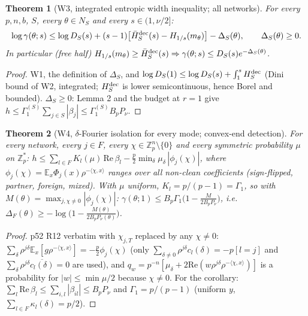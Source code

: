 \documentclass[11pt]{article}
\newtheorem{theorem}{Theorem}\newtheorem{lemma}[theorem]{Lemma}\newtheorem{corollary}[theorem]{Corollary}
\theoremstyle{remark}\newtheorem{remark}[theorem]{Remark}
\newcommand{\Hr}{H_{1/s}}
\begin{document}
\begin{theorem}[W3, integrated entropic width inequality; all networks]\label{W3}
For every $p,n,b$, $S$, every $\theta\in N_S$ and every $s\in(1,\nu/2]$:
\[\log\gamma(\theta;s)\le\log D_S(s)+(s-1)\big[\bar H^{\rm dec}_S(s)-\Hr(m_\theta)\big]-\Delta_S(\theta),\qquad\Delta_S(\theta)\ge0.\]
In particular (free half) $\Hr(m_\theta)\ge\bar H^{\rm dec}_S(s)\Rightarrow\gamma(\theta;s)\le D_S(s)e^{-\Delta_S(\theta)}$.
\end{theorem}
\begin{proof}
W1, the definition of $\Delta_S$, and $\log D_S(1)\le\log D_S(s)+\int_1^sH^{\rm dec}_S$ (Dini bound of W2, integrated; $H^{\rm dec}_S$ is
lower semicontinuous, hence Borel and bounded). $\Delta_S\ge0$: Lemma 2 and the budget at $r=1$ give
$h\le\Gamma^{(S)}_1\sum_{j\in S}|\beta_j|\le\Gamma^{(S)}_1B_pP_\nu$.
\end{proof}

\begin{theorem}[W4, $\delta$-Fourier isolation for every mode; convex-end detection]\label{W4}
For every network, every $j\in F$, every $\chi\in\mathbb Z_p^n\setminus\{0\}$ and every symmetric probability $\mu$ on $\mathbb Z_p^*$:
$h\le\sum_{l\in F}K_l(\mu)\,\mathrm{Re}\,\beta_l-\frac p2\min_\delta\mu_\delta\,|\phi_j(\chi)|$, where $\phi_j(\chi)=\mathbb E_x\Phi_j(x)\rho^{-\langle\chi,x\rangle}$
ranges over all non-clean coefficients (sign-flipped, partner, foreign, mixed). With $\mu$ uniform, $K_l=p/(p-1)=\Gamma_1$, so with
$M(\theta)=\max_{j,\chi\ne0}|\phi_j(\chi)|$: $\gamma(\theta;1)\le B_p\Gamma_1\big(1-\frac{M}{2B_pP_\nu}\big)$, i.e.\
$\Delta_F(\theta)\ge-\log\big(1-\frac{M(\theta)}{2B_pP_\nu(\theta)}\big)$.
\end{theorem}
\begin{proof}
p52 R12 verbatim with $\chi_{j,T}$ replaced by any $\chi\ne0$: $\sum_\delta\rho^{j\delta}\mathbb E_x[g\rho^{-\langle\chi,x\rangle}]=-\frac p2\phi_j(\chi)$
(only $\sum_{\delta\ne0}\rho^{j\delta}c_l(\delta)=-p[l=j]$ and $\sum_\delta\rho^{j\delta}\overline{c_l(\delta)}=0$ are used), and
$q_w=p^{-n}[\mu_\delta+2\mathrm{Re}(w\rho^{j\delta}\rho^{-\langle\chi,x\rangle})]$ is a probability for $|w|\le\min\mu/2$ because $\chi\ne0$.
For the corollary: $\sum_l\mathrm{Re}\,\beta_l\le\sum_{i,l}|\beta_{il}|\le B_pP_\nu$ and $\Gamma_1=p/(p-1)$ (uniform $y$, $\sum_{l\in F}\kappa_l(\delta)=p/2$).
\end{proof}
\end{document}
